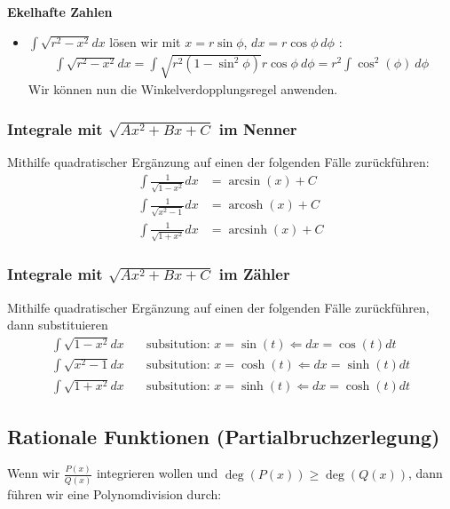 \documentclass[25pt]{sciposter}
\newenvironment{method}[1]{\begin{mdframed}[backgroundcolor=blue!10,innertopmargin=15pt, innerbottommargin=15pt, nobreak=true]
		\textbf{#1 }
	}
	{ 
	\end{mdframed}
}
\begin{document}
\begin{multicols}{3}
\begin{method}{Ekelhafte Zahlen}
\begin{itemize}
	\item $\int \sqrt{r^2 - x^2} dx$ lösen wir mit $x = r \sin \phi$, $dx = r \cos \phi \ d\phi$ :
	\begin{align*}
\int \sqrt{r^2 - x^2} dx = \int \sqrt{r^2 (1-\sin^2 \phi)} r \cos \phi \ d\phi = r^2 \int \cos^2(\phi) \ d\phi
\end{align*}
Wir können nun die Winkelverdopplungsregel anwenden.
	\end{itemize}
	
\end{method}

\subsubsection*{Integrale mit $\sqrt{Ax^2 + Bx + C}$ im Nenner}
Mithilfe quadratischer Ergänzung auf einen der folgenden Fälle zurückführen:
\begin{align*}
\int \frac{1}{\sqrt{1-x^2}} dx &= \arcsin(x) + C\\
\int \frac{1}{\sqrt{x^2-1}} dx &= \operatorname{arcosh}(x) + C\\
\int \frac{1}{\sqrt{1+x^2}} dx &= \operatorname{arcsinh}(x) + C
\end{align*}




\subsubsection*{Integrale mit $\sqrt{Ax^2 + Bx + C}$ im Zähler}
Mithilfe quadratischer Ergänzung auf einen der folgenden Fälle zurückführen, dann substituieren
\begin{align*}
\int {\sqrt{1-x^2}} dx \quad &\text{subsitution: } x = \sin(t) \Leftarrow dx = \cos(t) dt\\
\int {\sqrt{x^2-1}} dx \quad &\text{subsitution: } x = \cosh(t) \Leftarrow dx = \sinh(t) dt \\
\int {\sqrt{1+x^2}} dx \quad &\text{subsitution: } x = \sinh(t) \Leftarrow dx = \cosh(t) dt
\end{align*}



\subsection*{Rationale Funktionen (Partialbruchzerlegung)}

Wenn wir $\frac{P(x)}{Q(x)}$ integrieren wollen und $\deg(P(x)) \geq \deg(Q(x))$, dann führen wir eine Polynomdivision durch:


\end{multicols}
\end{document}
